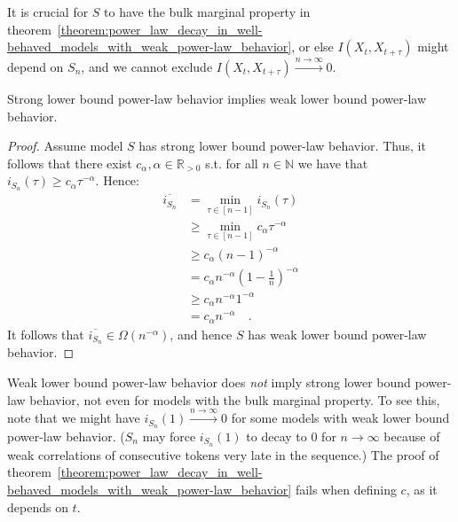 \documentclass[../../main.tex]{subfiles}
\begin{document}
    \begin{remark}
        It is crucial for $S$ to have the bulk marginal property in theorem~\ref{theorem:power_law_decay_in_well-behaved_models_with_weak_power-law_behavior}, or else $I(X_{t}, X_{t + \tau})$ might depend on $S_n$, and we cannot exclude $I(X_{t}, X_{t + \tau}) \xrightarrow{n \to \infty} 0$.
    \end{remark}

    \begin{proposition}
        \label{proposition:strong_slbplb_implies_wlbplb}
        Strong lower bound power-law behavior implies weak lower bound power-law behavior.
    \end{proposition}
    \vspace{-2.5em}
    \begin{proof}
        Assume model $S$ has strong lower bound power-law behavior. Thus, it follows that there exist $c_\alpha, \alpha \in \mathbb{R}_{>0}$ s.t. for all $n \in \mathbb{N}$ we have that $i_{S_n}(\tau) \geq c_\alpha \tau^{-\alpha}$. Hence:
        \begin{align*}
            \overline{i_{S_n}} &= \min_{\tau \in [n - 1]} i_{S_n}(\tau) \\
            &\geq \min_{\tau \in [n - 1]} c_\alpha \tau^{-\alpha} \\
            &\geq c_\alpha (n - 1)^{-\alpha} \\
            &= c_\alpha n^{-\alpha} (1 - \frac{1}{n})^{-\alpha} \\
            &\geq c_\alpha n^{-\alpha} 1^{-\alpha} \\
            &= c_\alpha n^{-\alpha} \quad .
        \end{align*}
        It follows that $\overline{i_{S_n}} \in \Omega(n^{-\alpha})$, and hence $S$ has weak lower bound power-law behavior.
    \end{proof}

    \begin{remark}
        Weak lower bound power-law behavior does \emph{not} imply strong lower bound power-law behavior, not even for models with the bulk marginal property. To see this, note that we might have  $i_{S_n}(1) \xrightarrow{n \to \infty} 0$ for some models with weak lower bound power-law behavior. ($S_n$ may force $i_{S_n}(1)$ to decay to $0$ for $n \to \infty$ because of weak correlations of consecutive tokens very late in the sequence.) The proof of theorem~\ref{theorem:power_law_decay_in_well-behaved_models_with_weak_power-law_behavior} fails when defining $c$, as it depends on $t$.
    \end{remark}
\end{document}
